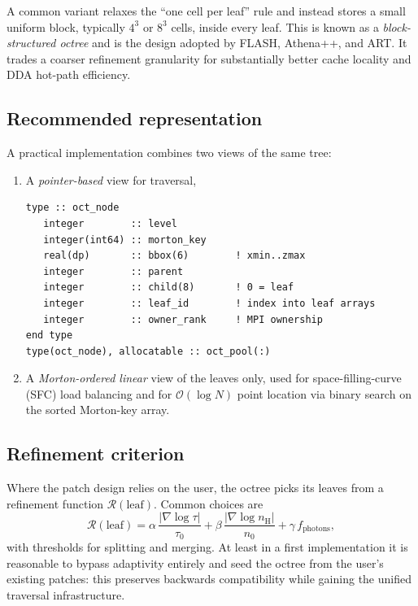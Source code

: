 \documentclass[11pt,a4paper]{my_memo}
\begin{document}
A common variant relaxes the ``one cell per leaf'' rule and instead stores a
small uniform block, typically $4^3$ or $8^3$ cells, inside every leaf.  This
is known as a \emph{block-structured octree} and is the design adopted by
FLASH, Athena++, and ART.  It trades a coarser refinement granularity for
substantially better cache locality and DDA hot-path efficiency.

\subsection{Recommended representation}

A practical implementation combines two views of the same tree:

\begin{enumerate}
\item A \emph{pointer-based} view for traversal,
  \begin{lstlisting}
type :: oct_node
   integer        :: level
   integer(int64) :: morton_key
   real(dp)       :: bbox(6)        ! xmin..zmax
   integer        :: parent
   integer        :: child(8)       ! 0 = leaf
   integer        :: leaf_id        ! index into leaf arrays
   integer        :: owner_rank     ! MPI ownership
end type
type(oct_node), allocatable :: oct_pool(:)
\end{lstlisting}
\item A \emph{Morton-ordered linear} view of the leaves only, used for
  space-filling-curve (SFC) load balancing and for $\mathcal{O}(\log N)$
  point location via binary search on the sorted Morton-key array.
\end{enumerate}

\subsection{Refinement criterion}

Where the patch design relies on the user, the octree picks its leaves from
a refinement function $\mathcal{R}(\text{leaf})$.  Common choices are
\begin{equation}
   \mathcal{R}(\text{leaf}) =
     \alpha \, \frac{|\nabla \log \tau|}{\tau_0}
   + \beta  \, \frac{|\nabla \log n_{\text{H}}|}{n_0}
   + \gamma \, f_{\text{photons}},
\end{equation}
with thresholds for splitting and merging.  At least in a first
implementation it is reasonable to bypass adaptivity entirely and seed the
octree from the user's existing patches: this preserves backwards
compatibility while gaining the unified traversal infrastructure.
\end{document}
